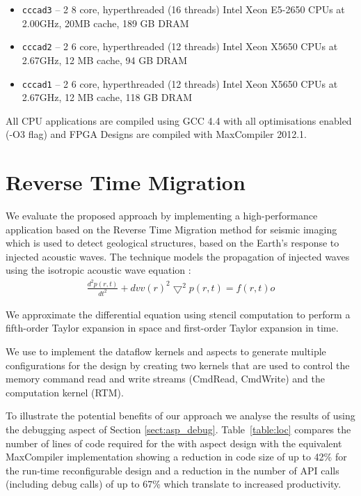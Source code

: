 \begin{itemize}
\item \texttt{cccad3} -- 2 8 core, hyperthreaded (16 threads) Intel
  Xeon E5-2650 CPUs at 2.00GHz, 20MB cache, 189 GB DRAM
\item \texttt{cccad2} -- 2 6 core, hyperthreaded (12 threads) Intel
  Xeon X5650 CPUs at 2.67GHz, 12 MB cache, 94 GB DRAM
\item \texttt{cccad1} -- 2 6 core, hyperthreaded (12 threads) Intel Xeon
  X5650 CPUs at 2.67GHz, 12 MB cache, 118 GB DRAM
\end{itemize}

All CPU applications are compiled using GCC 4.4 with all optimisations
enabled (-O3 flag) and FPGA Designs are compiled with MaxCompiler
2012.1.



\section{Reverse Time Migration}
\label{sec:RTM}
We evaluate the proposed approach by implementing a high-performance
application based on the Reverse Time Migration method for seismic
imaging which is used to detect geological structures, based on the
Earth's response to injected acoustic waves. The technique models the
propagation of injected waves using the isotropic acoustic wave
equation \cite{araya2011assessing}:
\begin{align}
\frac{d^2p(r,t)}{dt^2} + {dvv(r)}^2\bigtriangledown^2p(r,t) = f(r,t)
o\end{align}

We approximate the differential equation using stencil computation to
perform a fifth-order Taylor expansion in space and first-order Taylor
expansion in time.

We use \FAST{} to implement the dataflow kernels and aspects to
generate multiple configurations for the design by creating two
kernels that are used to control the memory command read and write
streams (CmdRead, CmdWrite) and the computation kernel (RTM).

To illustrate the potential benefits of our approach we analyse the
results of using the debugging aspect of Section
\ref{sect:asp_debug}. Table~\ref{table:loc} compares the number of
lines of code required for the \FAST{} with aspect design with the
equivalent MaxCompiler implementation showing a reduction in code size
of up to 42\% for the run-time reconfigurable design and a reduction
in the number of API calls (including debug calls) of up to 67\% which
translate to increased productivity.

